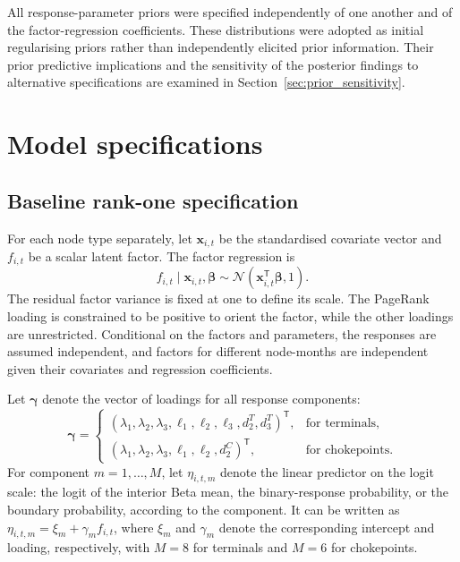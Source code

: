 \documentclass[pdftex,12pt,openright,a4paper,oneside]{book}
\begin{document}
All response-parameter priors were specified independently
of one another and of the factor-regression coefficients.
These distributions were adopted as initial regularising
priors rather than independently elicited prior information.
Their prior predictive implications and the sensitivity of
the posterior findings to alternative specifications are
examined in Section~\ref{sec:prior_sensitivity}.

\section{Model specifications} 
\label{sec:models}

\subsection{Baseline rank-one specification}
\label{subsec:simple_factor_specification}
For each node type separately, let $\boldsymbol{x}_{i,t}$ be the standardised covariate vector and $f_{i,t}$ be a scalar latent factor. The factor regression is
\begin{equation}
 f_{i,t}\mid\boldsymbol{x}_{i,t},\boldsymbol{\beta}
 \sim\mathcal{N}(\boldsymbol{x}_{i,t}^{\mathsf T}\boldsymbol{\beta},1).
 \label{eq:simple_factor}
\end{equation}
The residual factor variance is fixed at one to define its scale. 
The PageRank loading is constrained to be positive to orient the factor, while the other loadings are unrestricted. 
Conditional on the factors and parameters, the responses are assumed independent, and factors for different node-months are independent given their covariates and regression coefficients.

Let $\boldsymbol{\gamma}$ denote the vector of loadings for all
response components:
\begin{equation*}
\boldsymbol{\gamma}
=
\begin{cases}
(\lambda_1,\lambda_2,\lambda_3,
 \ell_1,\ell_2,\ell_3,d_2^T,d_3^T)^{\mathsf T},
& \text{for terminals},\\
(\lambda_1,\lambda_2,\lambda_3,
 \ell_1,\ell_2,d_2^C)^{\mathsf T},
& \text{for chokepoints}.
\end{cases}
\end{equation*}
For component $m=1,\ldots,M$, let $\eta_{i,t,m}$ denote
the linear predictor on the logit scale: the logit of
the interior Beta mean, the binary-response probability,
or the boundary probability, according to the component.
It can be written as
$\eta_{i,t,m}=\xi_m+\gamma_m f_{i,t}$,
where $\xi_m$ and $\gamma_m$ denote the corresponding
intercept and loading, respectively, with $M=8$ for
terminals and $M=6$ for chokepoints.
\end{document}
